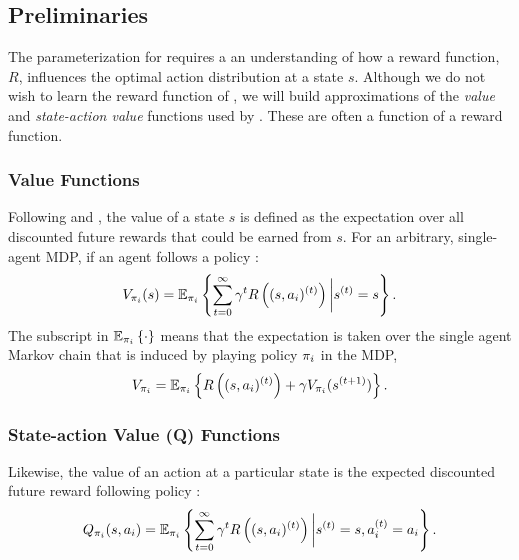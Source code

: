 \subsection{Preliminaries}\label{sec:policy_iteration_preliminaries}
    The parameterization for  requires a an understanding of how a reward function, $R$, influences the
    optimal action distribution at a state $s$. Although we do not wish to learn the reward function of , we
    will build approximations of the \textit{value} and \textit{state-action value} functions used by . These
    are often a function of a reward function.

\subsubsection{Value Functions}
    Following \cite{hernandez2012adaptive} and \cite{Sugiyama2015StatisticalRL}, the value of a state $s$ is defined as the
    expectation over all discounted future rewards that could be earned from $s$. For an arbitrary, single-agent \ac{MDP},
    if an agent  follows a policy :
    \[
    V_{\pi_{i}}(s) = \mathbb{E}_{\pi_{i}}\left\{\sum_{t=0}^{\infty} \gamma^t R\left((s,a_i)^{(t)}\right)
            \bigg|s^{(t)}=s\right\}.
    \]
    The subscript in $\mathbb{E}_{\pi_{i}}\left\{\cdot\right\}$ means that the expectation is taken over the single agent Markov
    chain that is induced by  playing policy $\pi_{i}$ in the \ac{MDP},
    \[
    V_{\pi_{i}} = \mathbb{E}_{\pi_{i}}\left\{R\left((s,a_i)^{(t)}\right) + \gamma V_{\pi_{i}}(s^{(t+1)})\right\}.
    \]

\subsubsection{State-action Value (Q) Functions}
    Likewise, the value of an action at a particular state is the expected discounted future reward following policy
    :
    \[
    Q_{\pi_{i}}(s,a_i) = \mathbb{E}_{\pi_{i}}\left\{\sum_{t=0}^{\infty} \gamma^t R\left((s,a_i)^{(t)}\right)
            \bigg|s^{(t)}=s, a_i^{(t)}=a_i\right\}.
    \]


